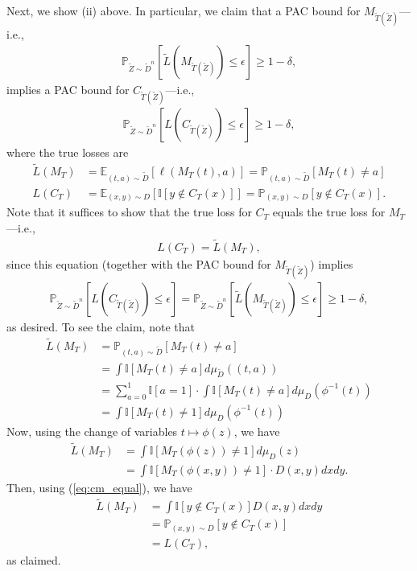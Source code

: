 \documentclass{article} \usepackage{iclr2020_conference,times}
\renewcommand{\(}						{\left(}
\renewcommand{\)}						{\right)}
\renewcommand{\[}						{\left[}
\renewcommand{\]}						{\right]}
\newcommand{\<}						{\left<}
\renewcommand{\>}						{\right>}
\begin{document}
Next, we show (ii) above. In particular, we claim that a PAC bound for $M_{\tilde T(\tilde Z)}$---i.e.,
\begin{align*}
\mathbb{P}_{\tilde Z\sim\tilde D^n}[\tilde{L}(M_{\tilde T(\tilde Z)})\le\epsilon]\ge1-\delta,
\end{align*}
implies a PAC bound for $C_{\tilde T(\tilde Z)}$---i.e.,
\begin{align*}
\mathbb{P}_{\tilde Z\sim\tilde D^n}[L(C_{\tilde T(\tilde Z)})\le\epsilon]\ge1-\delta,
\end{align*}
where the true losses are
\begin{align*}
\tilde L(M_T) &= \mathbb{E}_{(t,a)\sim\tilde D}[\ell(M_T(t),a)] = \mathbb{P}_{(t,a)\sim\tilde D}[M_T(t)\neq a] \\
L(C_T) &= \mathbb{E}_{(x,y)\sim D}[\mathbb{I}[y\not\in C_T(x)]] = \mathbb{P}_{(x,y)\sim D}[y\not\in C_T(x)].
\end{align*}
Note that it suffices to show that the true loss for $C_T$ equals the true loss for $M_T$---i.e., 
\begin{align*}
L(C_T) = \tilde{L}(M_T), \end{align*}
since this equation (together with the PAC bound for $M_{\tilde T(\tilde Z)}$) implies
\begin{align*}
\mathbb{P}_{\tilde Z\sim\tilde D^n}[L(C_{\tilde T(\tilde Z)})\le\epsilon]=\mathbb{P}_{\tilde Z\sim\tilde D^n}[\tilde{L}(M_{\tilde T(\tilde Z)})\le\epsilon]\ge1-\delta,
\end{align*}
as desired. To see the claim, note that
\begin{align*}
\tilde L(M_T) 
&= \mathbb{P}_{(t,a)\sim\tilde{D}}[M_T(t)\neq a]  \\	&= \int \mathbb{I}[M_T(t)\neq a] d\mu_{\tilde{D}}((t, a)) \\
&= \sum_{a=0}^1 \mathbb{I}[a=1] \cdot \int \mathbb{I}[M_T(t)\neq a] d\mu_D(\phi^{-1}(t)) \\
&= \int \mathbb{I}[M_T(t)\neq1] d\mu_D(\phi^{-1}(t))
\end{align*}
Now, using the change of variables $t\mapsto\phi(z)$, we have
\begin{align*}
\tilde L(M_T) &= \int \mathbb{I}[M_T(\phi(z))\neq1] d\mu_D(z) \\
&= \int \mathbb{I}[M_T(\phi(x, y))\neq 1] \cdot D(x, y) dx dy.
\end{align*}
Then, using (\ref{eq:cm_equal}), we have
\begin{align*}
\tilde L(M_T) &= \int \mathbb{I}[y \notin C_T(x)] D(x, y) dx dy \\
&= \mathbb{P}_{(x, y) \sim D}[ y \notin C_T(x)] \\
&= L(C_T),
\end{align*}
as claimed. 
\end{document}
